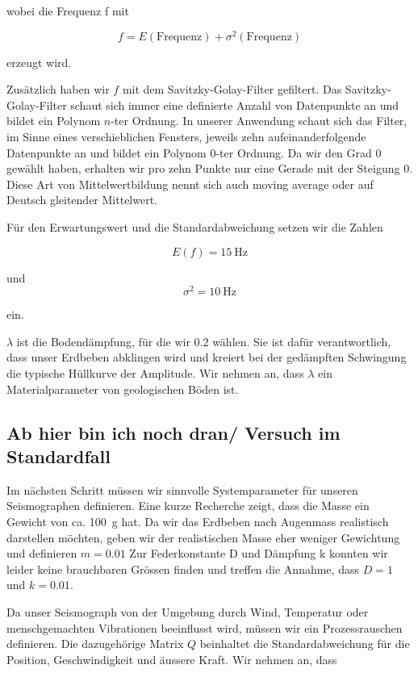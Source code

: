 wobei die Frequenz f mit

\begin{equation}
	f = E(\mathrm{Frequenz}) + \sigma^2(\mathrm{Frequenz})
\end{equation}

erzeugt wird.

Zusätzlich haben wir $f$ mit dem Savitzky-Golay-Filter gefiltert.
Das Savitzky-Golay-Filter schaut sich immer eine definierte Anzahl von Datenpunkte an
und bildet ein Polynom $n$-ter Ordnung. 
In unserer Anwendung schaut sich das Filter, im Sinne eines verschieblichen Fensters,
jeweils zehn aufeinanderfolgende Datenpunkte an und bildet ein Polynom $0$-ter Ordnung.
Da wir den Grad $0$ gewählt haben, erhalten wir pro zehn Punkte nur eine Gerade mit der Steigung $0$. 
Diese Art von Mittelwertbildung nennt sich auch moving average oder auf Deutsch gleitender Mittelwert.

Für den Erwartungswert und die Standardabweichung setzen wir die Zahlen 

\begin{equation}
E(f) = \SI{15}{\hertz}
\end{equation}

und 
\begin{equation}
\sigma^2 = \SI{10}{\hertz}
\end{equation}

ein.

$\lambda$ ist die Bodendämpfung, für die wir $0.2$ wählen.
Sie ist dafür verantwortlich, dass unser Erdbeben abklingen wird und kreiert bei der gedämpften Schwingung die typische Hüllkurve der Amplitude.
Wir nehmen an, dass $\lambda$ ein Materialparameter von geologischen Böden ist.

\subsection{Ab hier bin ich noch dran/ Versuch im Standardfall}
Im nächsten Schritt müssen wir sinnvolle Systemparameter für unseren Seismographen definieren.
Eine kurze Recherche zeigt, dass die Masse ein Gewicht von ca. \SI{100}{\gram} hat.
Da wir das Erdbeben nach Augenmass realistisch darstellen möchten, geben wir der realistischen Masse eher weniger Gewichtung und definieren $m = 0.01$
Zur Federkonstante D und Dämpfung k konnten wir leider keine brauchbaren Grössen finden und treffen die Annahme, dass $D = 1$ und $k = 0.01$.

Da unser Seismograph von der Umgebung durch Wind, Temperatur oder menschgemachten Vibrationen beeinflusst wird, müssen wir ein Prozessrauschen definieren.
Die dazugehörige Matrix $Q$ beinhaltet die Standardabweichung für die Position, Geschwindigkeit und äussere Kraft.
Wir nehmen an, dass

